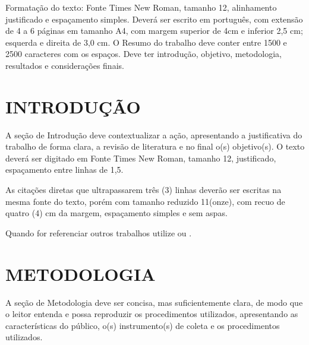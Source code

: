 \documentclass[%
  article,%
  a4paper,%
  12pt,%
  fleqn,%
  oneside,%
  chapter = TITLE,%
  section = TITLE,%
]{abntex2}
\affil{Coordenação de Ciência de Computação}%
\affil{Coordenação de Ciência de Computação}%
\affil{Coordenação de Ciência de Computação}%
\begin{document}

\begin{paginadetitulo}%

\begin{ambienteresumo}%
\leading{12pt}
Formatação do texto: Fonte Times New Roman, tamanho 12, alinhamento justificado e espaçamento simples. Deverá ser escrito em português, com extensão de 4 a 6 páginas em tamanho A4, com margem superior de 4cm e inferior 2,5 cm; esquerda e direita de 3,0 cm. O Resumo do trabalho deve conter entre 1500 e 2500 caracteres com os espaços. Deve ter introdução, objetivo, metodologia, resultados e considerações finais.

\end{ambienteresumo}
\end{paginadetitulo}
\textual%

\leading{18pt}
\section{INTRODUÇÃO}\label{sec:intro}

\begin{flushleft}%
A seção de Introdução deve contextualizar a ação, apresentando a justificativa do trabalho de forma clara, a revisão de literatura e no final o(s) objetivo(s). O texto deverá ser digitado em Fonte Times New Roman, tamanho 12, justificado, espaçamento entre linhas de 1,5.
\end{flushleft}

\begin{citacao}
\normalsize
    As citações diretas que ultrapassarem três (3) linhas deverão ser escritas na mesma fonte do texto, porém com tamanho reduzido 11(onze), com recuo de quatro (4) cm da margem, espaçamento simples e sem aspas.
\end{citacao}

Quando for referenciar outros trabalhos utilize \cite{gonccalves2002} ou \textcite{gonccalves2002}.

\section{METODOLOGIA}

\begin{flushleft}%
A seção de Metodologia deve ser concisa, mas suficientemente clara, de modo que o leitor entenda e possa reproduzir os procedimentos utilizados, apresentando as características do público, o(s) instrumento(s) de coleta e os procedimentos utilizados.
\end{flushleft}
\end{document}
